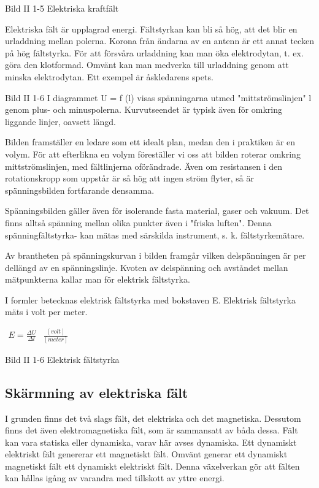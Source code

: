 Bild II 1-5 Elektriska kraftfält

Elektriska fält är upplagrad energi. Fältstyrkan kan bli så hög, att det blir en
urladdning mellan polerna. Korona från ändarna av en antenn är ett annat tecken på hög
fältstyrka. För att försvåra urladdning kan man öka elektrodytan, t. ex. göra den
klotformad. Omvänt kan man medverka till urladdning genom att minska elektrodytan.
Ett exempel är åskledarens spets.

Bild II 1-6
I diagrammet U = f (l) visas spänningarna utmed "mittströmslinjen" l genom plus- och
minuspolerna. Kurvutseendet är typisk även för omkring liggande linjer, oavsett längd.

Bilden framställer en ledare som ett idealt plan, medan den i praktiken är en volym.
För att efterlikna en volym föreställer vi oss att bilden roterar omkring
mittströmslinjen, med fältlinjerna oförändrade. Även om resistansen i den rotationskropp
som uppstår är så hög att ingen ström flyter, så är spänningsbilden fortfarande densamma.

Spänningsbilden gäller även för isolerande fasta material, gaser och vakuum.
Det finns alltså spänning mellan olika punkter även i "friska luften". Denna
spänningfältstyrka- kan mätas med särskilda instrument, s. k. fältstyrkemätare.

Av brantheten på spänningskurvan i bilden framgår vilken delspänningen är per dellängd av
en spänningslinje. Kvoten av delspänning och avståndet mellan mätpunkterna kallar man för
elektrisk fältstyrka.

I formler betecknas elektrisk fältstyrka med bokstaven E.
Elektrisk fältstyrka mäts i volt per meter.

$
\begin{array}{cc}
E=\frac{\Delta U}{\Delta l} & \frac{[volt]}{[meter]}
\end{array}
$

Bild II 1-6 Elektrisk fältstyrka

\subsection{Skärmning av elektriska fält}

I grunden finns det två slags fält, det elektriska och det magnetiska. Dessutom finns det
även elektromagnetiska fält, som är sammansatt av båda dessa. Fält kan vara statiska
eller dynamiska, varav här avses dynamiska. Ett dynamiskt elektriskt fält genererar ett
magnetiskt fält. Omvänt generar ett dynamiskt magnetiskt fält ett dynamiskt elektriskt
fält. Denna växelverkan gör att fälten kan hållas igång av varandra med tillskott av
yttre energi.


